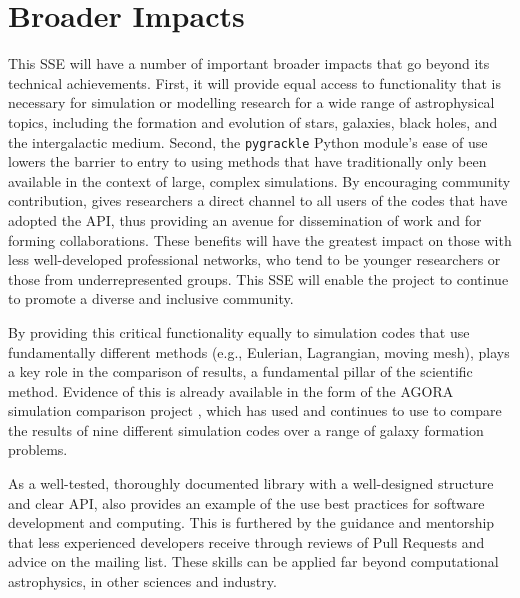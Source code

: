 \section{Broader Impacts}

This SSE will have a number of important broader impacts that go
beyond its technical achievements.  First, it will provide equal
access to functionality that is necessary for simulation or modelling
research for a wide range of astrophysical topics, including the
formation and evolution of stars, galaxies, black holes, and the
intergalactic medium.
Second, the \texttt{pygrackle} Python module's ease of use lowers the
barrier to entry to using methods that have traditionally only been
available in the context of large, complex simulations.  By
encouraging community contribution, \grackle{} gives researchers
a direct channel to all users of the codes that have adopted the
\grackle{} API, thus providing an avenue for dissemination of
work and for forming collaborations.  These benefits will have the
greatest impact on those with less well-developed professional
networks, who tend to be younger researchers or those from
underrepresented groups.  This SSE will enable the \grackle{} project
to continue to promote a diverse and inclusive community.

By providing this critical functionality equally to simulation codes
that use fundamentally different methods (e.g., Eulerian, Lagrangian,
moving mesh), \grackle{} plays a key role in the comparison of
results, a fundamental pillar of the scientific method.  Evidence of
this is already available in the form of the AGORA simulation
comparison project \citep{2014ApJS..210...14K, 2016ApJ...833..202K},
which has used and continues to use \grackle{} to compare the results
of nine
different simulation codes over a range of galaxy formation problems.

As a well-tested, thoroughly documented library with a well-designed
structure and clear API, \grackle{} also provides an example of the
use best practices for software development and computing.  This is
furthered by the guidance and mentorship that less experienced
developers receive through reviews of Pull Requests and
advice on the mailing list.  These skills can be applied far
beyond computational astrophysics, in other sciences and industry.
